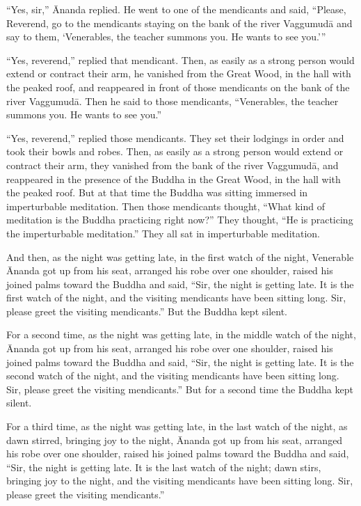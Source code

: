 \documentclass[12pt,openany]{book}%
\begin{document}
“Yes, sir,” Ānanda replied. He went to one of the mendicants and said, “Please, Reverend, go to the mendicants staying on the bank of the river \textsanskrit{Vaggumudā} and say to them, ‘Venerables, the teacher summons you. He wants to see you.’” 

“Yes, reverend,” replied that mendicant. Then, as easily as a strong person would extend or contract their arm, he vanished from the Great Wood, in the hall with the peaked roof, and reappeared in front of those mendicants on the bank of the river \textsanskrit{Vaggumudā}. Then he said to those mendicants, “Venerables, the teacher summons you. He wants to see you.” 

“Yes, reverend,” replied those mendicants. They set their lodgings in order and took their bowls and robes. Then, as easily as a strong person would extend or contract their arm, they vanished from the bank of the river \textsanskrit{Vaggumudā}, and reappeared in the presence of the Buddha in the Great Wood, in the hall with the peaked roof. But at that time the Buddha was sitting immersed in imperturbable meditation. Then those mendicants thought, “What kind of meditation is the Buddha practicing right now?” They thought, “He is practicing the imperturbable meditation.” They all sat in imperturbable meditation. 

And then, as the night was getting late, in the first watch of the night, Venerable Ānanda got up from his seat, arranged his robe over one shoulder, raised his joined palms toward the Buddha and said, “Sir, the night is getting late. It is the first watch of the night, and the visiting mendicants have been sitting long. Sir, please greet the visiting mendicants.” But the Buddha kept silent. 

For a second time, as the night was getting late, in the middle watch of the night, Ānanda got up from his seat, arranged his robe over one shoulder, raised his joined palms toward the Buddha and said, “Sir, the night is getting late. It is the second watch of the night, and the visiting mendicants have been sitting long. Sir, please greet the visiting mendicants.” But for a second time the Buddha kept silent. 

For a third time, as the night was getting late, in the last watch of the night, as dawn stirred, bringing joy to the night, Ānanda got up from his seat, arranged his robe over one shoulder, raised his joined palms toward the Buddha and said, “Sir, the night is getting late. It is the last watch of the night; dawn stirs, bringing joy to the night, and the visiting mendicants have been sitting long. Sir, please greet the visiting mendicants.” 
\end{document}
